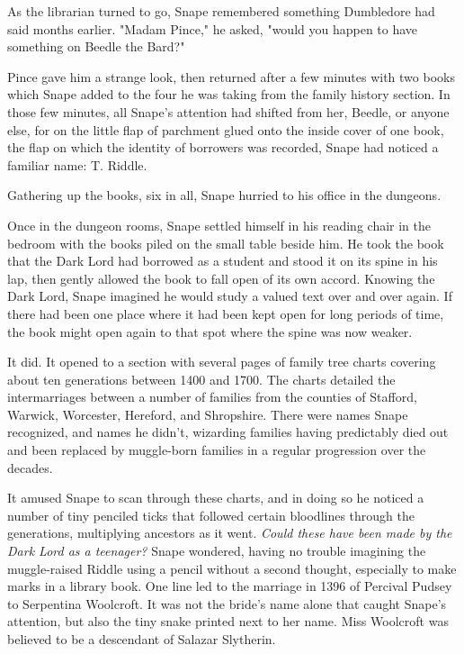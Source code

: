 As the librarian turned to go, Snape remembered something Dumbledore had said months earlier. "Madam Pince," he asked, "would you happen to have something on Beedle the Bard?"

Pince gave him a strange look, then returned after a few minutes with two books which Snape added to the four he was taking from the family history section. In those few minutes, all Snape's attention had shifted from her, Beedle, or anyone else, for on the little flap of parchment glued onto the inside cover of one book, the flap on which the identity of borrowers was recorded, Snape had noticed a familiar name: T. Riddle.

Gathering up the books, six in all, Snape hurried to his office in the dungeons.

Once in the dungeon rooms, Snape settled himself in his reading chair in the bedroom with the books piled on the small table beside him. He took the book that the Dark Lord had borrowed as a student and stood it on its spine in his lap, then gently allowed the book to fall open of its own accord. Knowing the Dark Lord, Snape imagined he would study a valued text over and over again. If there had been one place where it had been kept open for long periods of time, the book might open again to that spot where the spine was now weaker.

It did. It opened to a section with several pages of family tree charts covering about ten generations between 1400 and 1700. The charts detailed the intermarriages between a number of families from the counties of Stafford, Warwick, Worcester, Hereford, and Shropshire. There were names Snape recognized, and names he didn't, wizarding families having predictably died out and been replaced by muggle-born families in a regular progression over the decades.

It amused Snape to scan through these charts, and in doing so he noticed a number of tiny penciled ticks that followed certain bloodlines through the generations, multiplying ancestors as it went. \emph{Could these have been made by the Dark Lord as a teenager?} Snape wondered, having no trouble imagining the muggle-raised Riddle using a pencil without a second thought, especially to make marks in a library book. One line led to the marriage in 1396 of Percival Pudsey to Serpentina Woolcroft. It was not the bride's name alone that caught Snape's attention, but also the tiny snake printed next to her name. Miss Woolcroft was believed to be a descendant of Salazar Slytherin.

